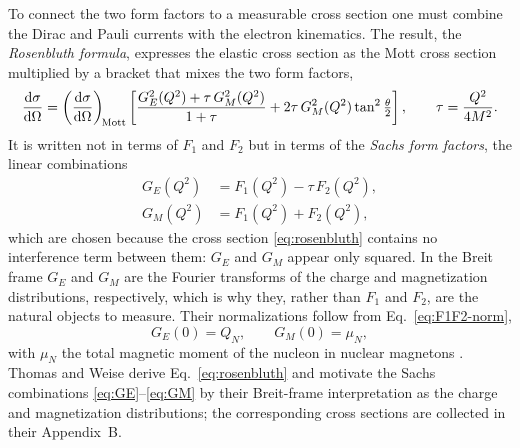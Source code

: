 To connect the two form factors to a measurable cross section one must combine the
Dirac and Pauli currents with the electron kinematics. The result, the
\emph{Rosenbluth formula}, expresses the elastic cross section as the Mott cross section
multiplied by a bracket that mixes the two form factors,
\begin{equation}
    \dv{\sigma}{\Omega}
    = \left(\dv{\sigma}{\Omega}\right)_{\!\mathrm{Mott}}
      \left[\frac{G_{E}^{2}(Q^{2}) + \tau\,G_{M}^{2}(Q^{2})}{1+\tau}
      + 2\tau\,G_{M}^{2}(Q^{2})\tan^{2}\tfrac{\theta}{2}\right],
    \qquad
    \tau = \frac{Q^{2}}{4M^{2}}.
    \label{eq:rosenbluth}
\end{equation}
It is written not in terms of $F_{1}$ and $F_{2}$ but in terms of the \emph{Sachs form
factors}, the linear combinations
\begin{align}
    G_{E}(Q^{2}) &= F_{1}(Q^{2}) - \tau\,F_{2}(Q^{2}), \label{eq:GE}\\
    G_{M}(Q^{2}) &= F_{1}(Q^{2}) + F_{2}(Q^{2}), \label{eq:GM}
\end{align}
which are chosen because the cross section \eqref{eq:rosenbluth} contains no
interference term between them: $G_{E}$ and $G_{M}$ appear only squared. In the
Breit frame $G_{E}$ and $G_{M}$ are the Fourier transforms of the charge and
magnetization distributions, respectively, which is why they, rather than $F_{1}$ and
$F_{2}$, are the natural objects to measure. Their normalizations follow from
Eq.~\eqref{eq:F1F2-norm},
\begin{equation}
    G_{E}(0) = Q_{N}, \qquad G_{M}(0) = \mu_{N},
    \label{eq:GEGM-norm}
\end{equation}
with $\mu_{N}$ the total magnetic moment of the nucleon in nuclear magnetons
\cite[Ch.~14]{Amsler2018}. Thomas and Weise \cite[Ch.~2.1]{ThomasWeise2001} derive
Eq.~\eqref{eq:rosenbluth} and motivate the Sachs combinations
\eqref{eq:GE}--\eqref{eq:GM} by their Breit-frame interpretation as the charge and
magnetization distributions; the corresponding cross sections are collected in their
Appendix~B.

